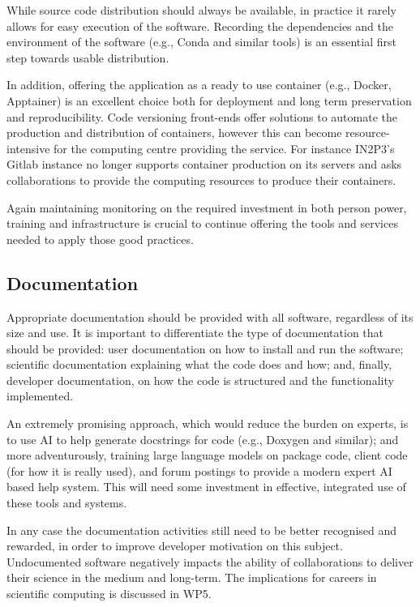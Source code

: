While source code distribution should always be available, in practice it rarely allows for easy execution of the software. Recording the dependencies and the environment of the software (e.g., Conda and similar tools) is an essential first step towards usable distribution.

In addition, offering the application as a ready to use container (e.g., Docker, Apptainer) is an excellent choice both for deployment and long term preservation and reproducibility. Code versioning front-ends offer solutions to automate the production and distribution of containers, however this can become resource-intensive for the computing centre providing the service. For instance IN2P3's Gitlab instance no longer supports container production on its servers and asks collaborations to provide the computing resources to produce their containers.

Again maintaining monitoring on the required  investment in both person power, training and infrastructure is crucial to continue offering the tools and services needed to apply those good practices.


\subsection{Documentation}

Appropriate documentation should be provided with all software, regardless of its size and use. It is important to differentiate the type of documentation that should be provided: user documentation on how to install and run the software; scientific documentation explaining what the code does and how; and, finally, developer documentation, on how the code is structured and the functionality implemented.

An extremely promising approach, which would reduce the burden on experts, is to use AI to help generate docstrings for code (e.g., Doxygen and similar); and more adventurously, training large language models on package code, client code (for how it is really used), and forum postings to provide a modern expert AI based help system. This will need some investment in effective, integrated use of these tools and systems.

In any case the documentation activities still need to be better recognised and rewarded, in order to improve developer motivation on this subject.  Undocumented software negatively impacts the ability of collaborations to deliver their science in the medium and long-term.  The implications for careers in scientific computing is discussed in WP5.



